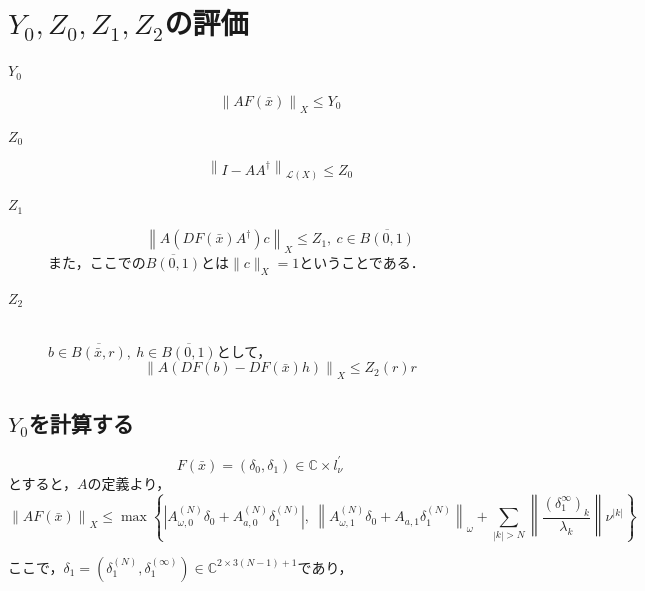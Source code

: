 \documentclass[11pt,a4paper,titlepage]{jsreport}
\theoremstyle{definition}
\begin{document}
\section{$Y_0,Z_0,Z_1,Z_2$の評価}
\label{sct:Y0,Z0,Z1,Z2の評価}
\begin{description}
  \item[$Y_0$]
    \begin{equation}
      \label{eq:y0}
      \left\| AF\left(\bar{x}\right)\right\|_X \leq Y_0
    \end{equation}
  \item[$Z_0$]
    \begin{equation*}
      \left\| I-AA^\dagger \right\|_{\mathcal{L}\left(
      X
      \right)} \leq Z_0
    \end{equation*}
  \item[$Z_1$]
    \begin{equation*}
      \left\| A \left(DF \left( \bar{x} \right) A^\dagger \right) c \right\|_X \leq Z_1,\ c\in \overline{B(0,1)}
    \end{equation*}
    また，ここでの$\overline{B(0,1)}$とは$\|c\|_X=1$ということである．
  \item[$Z_2$]
    \quad \\
    $b\in \overline{B\left(\bar{x},r\right)},\ h\in \overline{B(0,1)}$として，
    \begin{equation*}
      \left\| A \left(DF \left( b \right) - DF \left( \bar{x} \right) h \right) \right\|_{X} \leq Z_2 (r)r
    \end{equation*}
\end{description}

\subsection{$Y_0$を計算する}
\begin{equation*}
  F(\bar{x}) = (\delta_0, \delta_1) \in \mathbb{C}\times l_\nu^\prime
\end{equation*}
とすると，$A$の定義より，
\begin{equation*}
  \left\| AF(\bar{x}) \right\|_X \leq \max \left\{ \left| A_{\omega, 0}^{(N)} \delta_0 + A_{a,0}^{(N)} \delta_1^{(N)} \right|,\  \left\| A_{\omega,1}^{(N)} \delta_0 + A_{a,1} \delta_1^{(N)} \right\|_\omega + \sum_{|k|>N} \left\| \frac{\left(\delta_1^\infty\right)_k}{\lambda_k}  \right\| \nu^{|k|} \right\}
\end{equation*}

ここで，$\delta_1 = \left( \delta_1^{(N)}, \delta_1^{(\infty)} \right) \in \mathbb{C}^{2 \times 3(N-1)+1}$であり，
\end{document}
